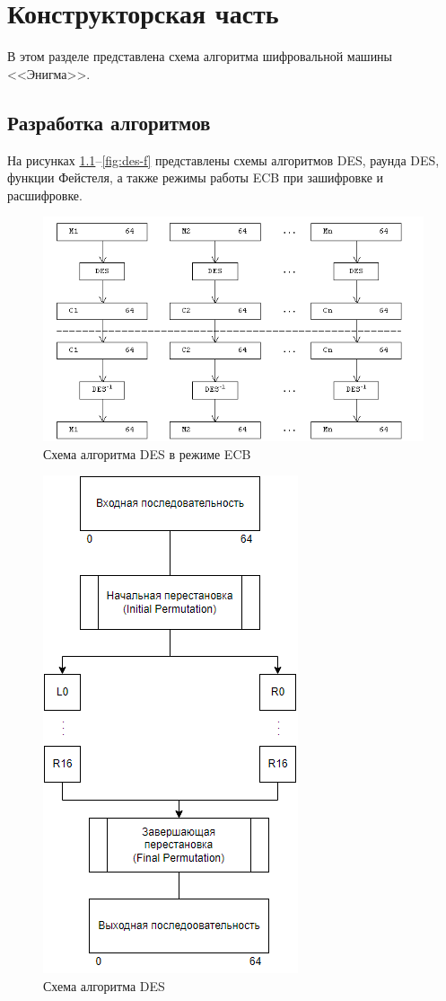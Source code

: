 \chapter{Конструкторская часть}

В этом разделе представлена схема алгоритма шифровальной машины <<Энигма>>.

\section{Разработка алгоритмов}

На рисунках \ref{fig:des-ecb}--\ref{fig:des-f} представлены схемы алгоритмов DES, раунда DES, функции Фейстеля, а также режимы работы ECB при зашифровке и расшифровке.

\begin{figure}[ht!]
	\centering
	\includegraphics[width=0.9\linewidth]{img/des-ecb.png}
	\caption{Схема алгоритма DES в режиме ECB}
	\label{fig:des-ecb}
\end{figure}

\begin{figure}[ht!]
	\centering
	\includegraphics[width=0.4\linewidth]{img/des-al.png}
	\caption{Схема алгоритма DES}
	\label{fig:des-al}
\end{figure}

